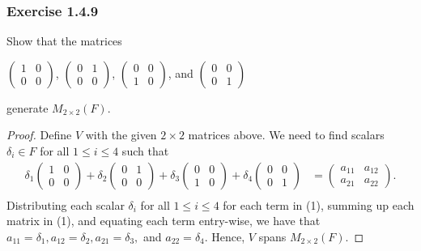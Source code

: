 \subsubsection{Exercise 1.4.9} Show that the matrices
\begin{center}
    \( \begin{pmatrix}
        1 & 0 \\
        0 & 0 
    \end{pmatrix} \), \( \begin{pmatrix}
        0 & 1 \\ 
        0 & 0 
    \end{pmatrix} \), \( \begin{pmatrix}
        0 & 0 \\
        1 & 0 
    \end{pmatrix} \), and  \( \begin{pmatrix}
        0 & 0 \\
        0 & 1 
    \end{pmatrix} \)
\end{center}
generate \( M_{2 \times 2 }(F) \).
\begin{proof}
    Define \( V  \) with the given \( 2 \times 2  \) matrices above. We need to find scalars \( \delta_{i} \in F  \) for all \( 1 \leq i \leq 4 \) such that
    \begin{align*}
        \delta_{1} \begin{pmatrix}
            1 & 0 \\
            0 & 0 
            \end{pmatrix} + \delta_{2} \begin{pmatrix}
            0 & 1 \\
            0 & 0 
        \end{pmatrix} + \delta_3 \begin{pmatrix}
            0 & 0 \\
            1 & 0 
            \end{pmatrix} + \delta_{4} \begin{pmatrix}
            0 & 0 \\
            0 & 1 
        \end{pmatrix} &= \begin{pmatrix}
        a_{11}  &  a_{12} \\
        a_{21} & a_{22} 
    \end{pmatrix}.  \tag{1}   \\
    \end{align*}
    Distributing each scalar \( \delta_i  \) for all \( 1 \leq i \leq 4  \) for each term in (1), summing up each matrix in (1), and equating each term entry-wise, we have that \( a_{11} = \delta_{1}, a_{12} = \delta_{2} , a_{21} = \delta_{3} ,   \) and \( a_{22} = \delta_{4}  \). Hence, \( V  \) spans \( M_{2 \times2 }(F) \).
\end{proof}

